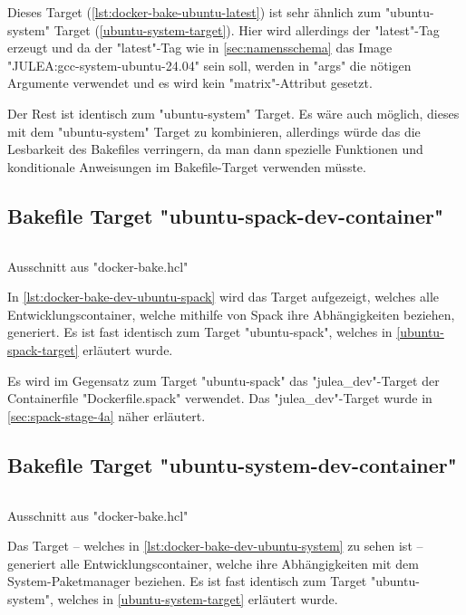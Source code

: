 Dieses Target (\cref{lst:docker-bake-ubuntu-latest}) ist sehr ähnlich zum "ubuntu-system" Target (\cref{ubuntu-system-target}). Hier wird allerdings der "latest"-Tag erzeugt und da der "latest"-Tag wie in \cref{sec:namensschema} das Image "JULEA:gcc-system-ubuntu-24.04" sein soll, werden in "args" die nötigen Argumente verwendet und es wird kein "matrix"-Attribut gesetzt. 

Der Rest ist identisch zum "ubuntu-system" Target. Es wäre auch möglich, dieses mit dem "ubuntu-system" Target zu kombinieren, allerdings würde das die Lesbarkeit des Bakefiles verringern, da man dann spezielle Funktionen und konditionale Anweisungen im Bakefile-Target verwenden müsste.

\subsection{Bakefile Target "ubuntu-spack-dev-container"} \label{sec:ubuntu-spack-dev-container}

\begin{listing}[H]
    \inputminted[firstline=58,lastline=77]{./lexers/docker-bake-lexer.py}{./code-examples/docker-bake.hcl}
    \caption{Ausschnitt aus "docker-bake.hcl"}
    \label{lst:docker-bake-dev-ubuntu-spack}
\end{listing}

In \cref{lst:docker-bake-dev-ubuntu-spack} wird das Target aufgezeigt, welches alle Entwicklungscontainer, welche mithilfe von Spack ihre Abhängigkeiten beziehen, generiert. Es ist fast identisch zum Target "ubuntu-spack", welches in \cref{ubuntu-spack-target} erläutert wurde.

Es wird im Gegensatz zum Target "ubuntu-spack" das "julea\_dev"-Target der Containerfile "Dockerfile.spack" verwendet. Das "julea\_dev"-Target wurde in \cref{sec:spack-stage-4a} näher erläutert.

\subsection{Bakefile Target "ubuntu-system-dev-container"}

\begin{listing}[H]
    \inputminted[firstline=80,lastline=94]{./lexers/docker-bake-lexer.py}{./code-examples/docker-bake.hcl}
    \caption{Ausschnitt aus "docker-bake.hcl"}
    \label{lst:docker-bake-dev-ubuntu-system}
\end{listing}

Das Target – welches in \cref{lst:docker-bake-dev-ubuntu-system} zu sehen ist – generiert alle Entwicklungscontainer, welche ihre Abhängigkeiten mit dem System-Paketmanager beziehen. Es ist fast identisch zum Target "ubuntu-system", welches in \cref{ubuntu-system-target} erläutert wurde.

